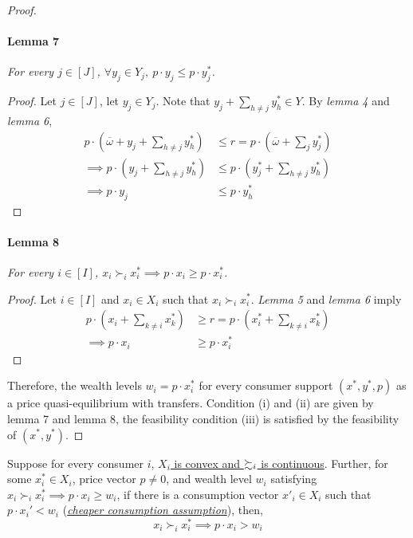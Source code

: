 \documentclass{report}
\begin{document}
\begin{proof}
			\paragraph{Lemma 7} \emph{For every $j \in [J]$, $\forall y_j \in Y_j,\ p \cdot y_j \leq p \cdot y_j^*$.}
			\begin{proof}
				Let $j \in [J]$, let $y_j \in Y_j$. Note that $y_j + \sum_{h \neq j} y_h^* \in Y$. By \emph{lemma 4} and \emph{lemma 6},
				\begin{align}
					p \cdot \left (\overline{\omega} + y_j + \sum_{h \neq j} y_h^* \right ) &\leq r = p \cdot \left ( \overline{\omega} + \sum_{j} y_j^* \right ) \\
					\implies p \cdot \left (y_j + \sum_{h \neq j} y_h^* \right ) &\leq p \cdot \left (y_j^* + \sum_{h \neq j} y_h^* \right ) \\
					\implies p \cdot y_j &\leq p \cdot y_h^*
				\end{align}
			\end{proof}
			\paragraph{Lemma 8} \emph{For every $i \in [I]$, $x_i \succ_i x_i^* \implies p \cdot x_i \geq p \cdot x_i^*$.}
			\begin{proof}
				Let $i \in [I]$ and $x_i \in X_i$ such that $x_i \succ_i x_i^*$. \emph{Lemma 5} and \emph{lemma 6} imply
				\begin{align}
					p \cdot \left (x_i + \sum_{k \neq i} x_k^* \right ) &\geq r = p \cdot \left (x_i^* + \sum_{k \neq i} x_k^* \right ) \\
					\implies p \cdot x_i &\geq p \cdot x_i^*
				\end{align}
			\end{proof}
			Therefore, the wealth levels $w_i = p \cdot x_i^*$ for every consumer support $(x^*, y^*, p)$ as a price quasi-equilibrium with transfers. Condition (i) and (ii) are given by lemma 7 and lemma 8, the feasibility condition (iii) is satisfied by the feasibility of $(x^*, y^*)$.
		\end{proof}
		
		\begin{proposition}
			Suppose for every consumer $i$, \ul{$X_i$ is convex and $\succsim_i$ is continuous}. Further, for some $x_i^* \in X_i$, price vector $p \neq 0$, and wealth level $w_i$ satisfying $x_i \succ_i x_i^* \implies p \cdot x_i \geq w_i$, if there is a consumption vector $x'_i \in X_i$ such that $p \cdot x_i' < w_i$ (\ul{\emph{cheaper consumption assumption}}), then, 
			\begin{equation}
				x_i \succ_i x_i^* \implies p \cdot x_i > w_i
			\end{equation}
		\end{proposition}
		
\end{document}
